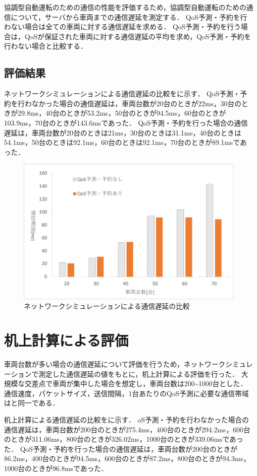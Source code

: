 \documentclass[a4paper,11pt,uplatex]{ujreport}
\begin{document}
  協調型自動運転のための通信の性能を評価するため，協調型自動運転のための通信について，サーバから車両までの通信遅延を測定する．
  QoS予測・予約を行わない場合は全ての車両に対する通信遅延を求める．
  QoS予測・予約を行う場合は，QoSが保証された車両に対する通信遅延の平均を求め，QoS予測・予約を行わない場合と比較する．


\subsection{評価結果}
\label{sec:NSの評価結果}

  ネットワークシミュレーションによる通信遅延の比較をに示す．
  QoS予測・予約を行わなかった場合の通信遅延は，車両台数が20台のときが22ms，30台のときが29.8ms，40台のときが53.2ms，50台のときが94.5ms，60台のときが103.9ms，70台のときが143.6msであった．
  QoS予測・予約を行った場合の通信遅延は，車両台数が20台のときは21ms，30台のときは31.1ms，40台のときは54.1ms，50台のときは92.1ms，60台のときは92.1ms，70台のときが89.1msであった．
  
  \begin{figure}[tb]
    \centering
    \includegraphics[width=\linewidth]{img/ネットワークシミュレーションによる通信遅延の比較.pdf}
    \caption{ネットワークシミュレーションによる通信遅延の比較}
    \label{fig:NSdelay}
  \end{figure}

\section{机上計算による評価}
\label{sec:Math評価}

車両台数が多い場合の通信遅延について評価を行うため，ネットワークシミュレーションで測定した通信遅延の値をもとに，机上計算による評価を行った．
大規模な交差点で車両が集中した場合を想定し，車両台数は200\textasciitilde1000台とした．
通信速度，パケットサイズ，送信間隔，1台あたりのQoS予測に必要な通信帯域はと同一である．\par
机上計算による通信遅延の比較をに示す．
oS予測・予約を行わなかった場合の通信遅延は，車両台数が200台のときが275.4ms，400台のときが294.2ms，600台のときが311.06ms，800台のときが326.02ms，1000台のときが339.06msであった．
QoS予測・予約を行った場合の通信遅延は，車両台数が200台のときが86.2ms，400台のときが94.5ms，600台のときが87.2ms，800台のときが94.3ms，1000台のときが96.8msであった．
\end{document}

